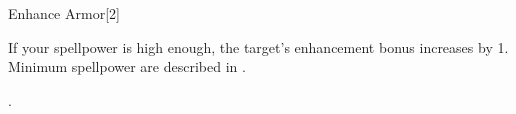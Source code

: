 \begin{spellsection}{Enhance Armor}[2]
    \begin{spellheader}
    \end{spellheader}
    \begin{spellcontent}
        \begin{spelltargetinginfo}
        \end{spelltargetinginfo}
        \begin{spelleffects}
            \spelleffect If your spellpower is high enough, the target's enhancement bonus increases by 1. Minimum spellpower are described in .
        \end{spelleffects}
    \end{spellcontent}
    \begin{spellfooter}
        .
    \end{spellfooter}
\end{spellsection}

